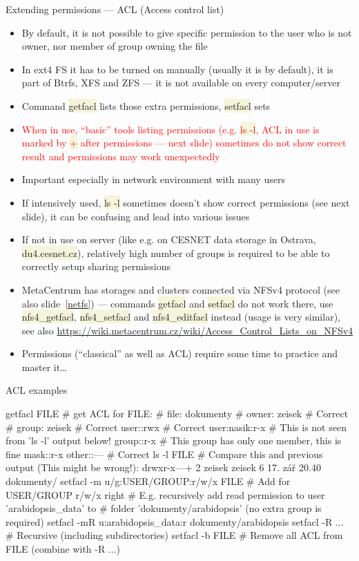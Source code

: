 \documentclass[compress, ucs, xelatex, 11pt, xcolor=svgnames, aspectratio=169,
	hyperref={
		bookmarks=true,
		unicode=true,
		colorlinks=true,
		pdftitle={Linux, command line and MetaCentrum},
		plainpages=false,
		pdfauthor={Vojtech Zeisek},
		pdfsubject={Course about use of Linux command line, writing shell scripts and using MetaCentrum of CESNET},
		pdfcreator={XeLaTeX},
		pdfkeywords={Linux, GNU, BASH, shell, command line, MetaCentrum},
		linkcolor=DarkRed, %
		anchorcolor=DarkBlue, %
		citecolor=Indigo, %
		filecolor=NavyBlue, %
		menucolor=DarkMagenta, %
		urlcolor=DarkBlue, %
		pdftex},
	url={hyphens, lowtilde} %
	]{beamer}
\renewcommand{\texttt}[1]{\colorbox{Beige}{{\ttfamily #1}}}
\renewcommand{\alert}[1]{\textcolor{red}{#1}}
\begin{document}
\begin{frame}[allowframebreaks]{Extending permissions --- ACL (Access control list)}
	\label{acl}
	\begin{itemize}
		\item By default, it is not possible to give specific permission to the user who is not owner, nor member of group owning the file
		\item In ext4 FS it has to be turned on manually (usually it is by default), it is part of Btrfs, XFS and ZFS --- it is not available on every computer/server
		\item Command \texttt{getfacl} lists those extra permissions, \texttt{setfacl} sets
		\item \alert{When in use, \enquote{basic} tools listing permissions (e.g. \texttt{ls -l}, ACL in use is marked by \texttt{+} after permissions --- next slide) sometimes do not show correct result and permissions may work unexpectedly}
		\item Important especially in network environment with many users
		\item If intensively used, \texttt{ls -l} sometimes doesn't show correct permissions (see next slide), it can be confusing and lead into various issues
		\item If not in use on server (like e.g. on CESNET data storage in Ostrava, \texttt{du4.cesnet.cz}), relatively high number of groups is required to be able to correctly setup sharing permissions
		\item MetaCentrum has storages and clusters connected via NFSv4 protocol (see also slide~\ref{netfs}) --- commands \texttt{getfacl} and \texttt{setfacl} do not work there, use \texttt{nfs4\_getfacl}, \texttt{nfs4\_setfacl} and \texttt{nfs4\_editfacl} instead (usage is very similar), see also \url{https://wiki.metacentrum.cz/wiki/Access_Control_Lists_on_NFSv4}
		\item Permissions (\enquote{classical} as well as ACL) require some time to practice and master it\ldots
	\end{itemize}
\end{frame}

\begin{frame}[fragile]{ACL examples}
	\begin{bashcode}
    getfacl FILE # get ACL for FILE:
    # file: dokumenty
    # owner: zeisek # Correct
    # group: zeisek # Correct
    user::rwx       # Correct
    user:nasik:r-x  # This is not seen from 'ls -l' output below!
    group::r-x      # This group has only one member, this is fine
    mask::r-x
    other::---      # Correct
    ls -l FILE # Compare this and previous output (This might be wrong!):
    drwxr-x---+  2 zeisek zeisek     6 17. zář 20.40 dokumenty/
    setfacl -m u/g:USER/GROUP:r/w/x FILE # Add for USER/GROUP r/w/x right
    # E.g. recursively add read permission to user 'arabidopsis_data' to
    # folder 'dokumenty/arabidopsis' (no extra group is required)
    setfacl -mR u:arabidopsis_data:r dokumenty/arabidopsis
    setfacl -R ... # Recursive (including subdirectories)
    setfacl -b FILE # Remove all ACL from FILE (combine with -R ...)
	\end{bashcode}
\end{frame}
\end{document}
